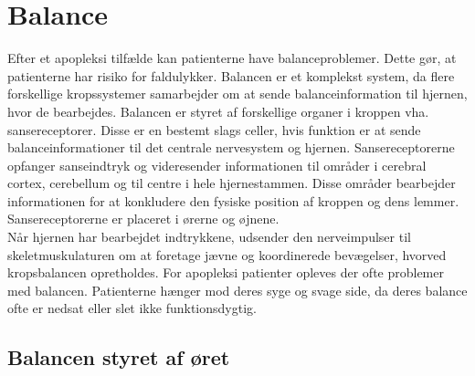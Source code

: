 \section{Balance}
Efter et apopleksi tilfælde kan patienterne have balanceproblemer. Dette gør, at patienterne har risiko for faldulykker. Balancen er et komplekst system, da flere forskellige kropssystemer samarbejder om at sende balanceinformation til hjernen, hvor de bearbejdes. Balancen er styret af forskellige organer i kroppen vha. sansereceptorer. Disse er en bestemt slags celler, hvis funktion er at sende balanceinformationer til det centrale nervesystem og hjernen. Sansereceptorerne opfanger sanseindtryk og videresender informationen til områder i cerebral cortex, cerebellum og til centre i hele hjernestammen. Disse områder bearbejder informationen for at konkludere den fysiske position af kroppen og dens lemmer. Sansereceptorerne er placeret i ørerne og øjnene. \cite{Martini2012}   \\
Når hjernen har bearbejdet indtrykkene, udsender den nerveimpulser til skeletmuskulaturen om at foretage jævne og koordinerede bevægelser, hvorved kropsbalancen opretholdes.\cite{Martini2012} For apopleksi patienter opleves der ofte problemer med balancen. Patienterne hænger mod deres syge og svage side, da deres balance ofte er nedsat eller slet ikke funktionsdygtig.\cite{Karnath2003}

\subsection{Balancen styret af øret} 

